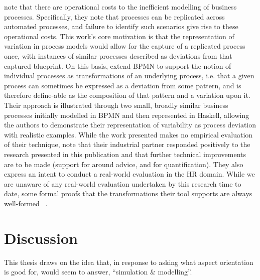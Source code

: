 \citeauthor{Machado_2011} note that there are operational costs to the
inefficient modelling of business processes. Specifically, they note that
processes can be replicated across automated processes, and failure to identify
such scenarios give rise to these operational costs. This work's core motivation
is that the representation of variation in process models would allow for the
capture of a replicated process once, with instances of similar processes
described as deviations from that captured blueprint. On this basis,
\citeauthor{Machado_2011} extend BPMN to support the notion of individual
processes as transformations of an underlying process, i.e. that a given process
can sometimes be expressed as a deviation from some pattern, and is therefore
define-able as the composition of that pattern and a variation upon it. Their
approach is illustrated through two small, broadly similar business processes
initially modelled in BPMN and then represented in Haskell, allowing the authors
to demonstrate their representation of variability as process deviation with
realistic examples. While the work presented makes no empirical evaluation of
their technique, \citeauthor{Machado_2011} note that their industrial partner
responded positively to the research presented in this publication and that
further technical improvements are to be made (support for around advice, and
for quantification). They also express an intent to conduct a real-world
evaluation in the HR domain. While we are unaware of any real-world evaluation
undertaken by this research time to date, some formal proofs that the
transformations their tool supports are always well-formed ~\cite{machado2012formal}.


\section{Discussion}\label{sec:lit_discussion}


This thesis draws on the idea that, in response to
\citeauthor{steimann06paradoxical} asking what aspect orientation is good for,
\citeauthor{gulyas1999use} would seem to answer, ``simulation \&
modelling''.

